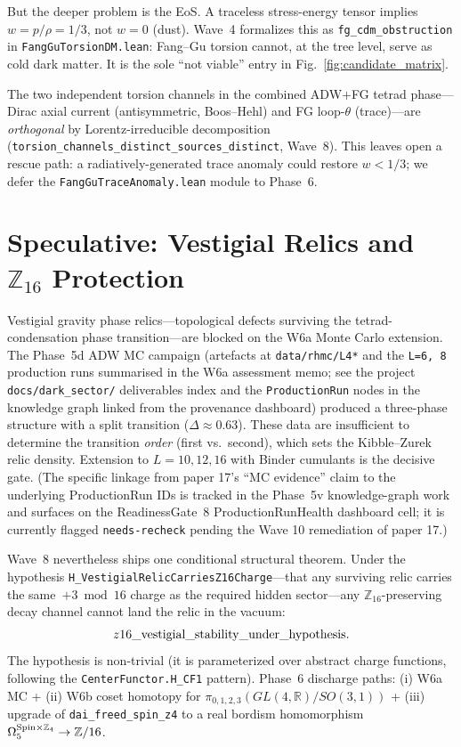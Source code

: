 \documentclass[aps,prd,twocolumn,showpacs,superscriptaddress,nofootinbib]{revtex4-2}
\begin{document}
But the deeper problem is the EoS. A traceless stress-energy tensor
implies $w = p/\rho = 1/3$, not $w = 0$ (dust). Wave~4 formalizes this
as \texttt{fg\_cdm\_obstruction} in \texttt{FangGuTorsionDM.lean}:
Fang--Gu torsion cannot, at the tree level, serve as cold dark matter.
It is the sole ``not viable'' entry in Fig.~\ref{fig:candidate_matrix}.

The two independent torsion channels in the combined ADW+FG tetrad
phase---Dirac axial current (antisymmetric, Boos--Hehl) and FG
loop-$\theta$ (trace)---are \emph{orthogonal} by Lorentz-irreducible
decomposition
(\texttt{torsion\_channels\_distinct\_sources\_distinct},
Wave~8). This leaves open a rescue path: a radiatively-generated
trace anomaly could restore $w < 1/3$; we defer the
\texttt{FangGuTraceAnomaly.lean} module to Phase~6.

\section{Speculative: Vestigial Relics and $\mathbb{Z}_{16}$ Protection}
\label{sec:speculative}

Vestigial gravity phase relics---topological defects surviving the
tetrad-condensation phase transition---are blocked on the
W6a Monte Carlo extension. The Phase~5d ADW MC campaign (artefacts at
\texttt{data/rhmc/L4*} and the \texttt{L=6, 8} production runs
summarised in the W6a assessment memo; see the project
\texttt{docs/dark\_sector/} deliverables index and the
\texttt{ProductionRun} nodes in the knowledge graph linked from the
provenance dashboard) produced a three-phase structure with a split
transition ($\Delta \approx 0.63$). These data are insufficient to
determine the transition \emph{order} (first vs.\ second), which sets
the Kibble--Zurek relic density. Extension to $L = 10, 12, 16$ with
Binder cumulants is the decisive gate. (The specific linkage from
paper 17's ``MC evidence'' claim to the underlying ProductionRun IDs
is tracked in the Phase~5v knowledge-graph work and surfaces on the
ReadinessGate~8 ProductionRunHealth dashboard cell; it is currently
flagged \texttt{needs-recheck} pending the Wave 10 remediation of
paper 17.)

Wave~8 nevertheless ships one conditional structural theorem. Under the
hypothesis \texttt{H\_VestigialRelicCarriesZ16Charge}---that any
surviving relic carries the same~$+3 \bmod 16$ charge as the required
hidden sector---any $\mathbb{Z}_{16}$-preserving decay channel cannot
land the relic in the vacuum:
\begin{equation}
z16\_{\rm vestigial\_{\rm stability\_under\_hypothesis}}.
\end{equation}
The hypothesis is non-trivial (it is parameterized over abstract charge
functions, following the \texttt{CenterFunctor.H\_CF1} pattern). Phase~6
discharge paths: (i) W6a MC + (ii) W6b coset homotopy for
$\pi_{0,1,2,3}(GL(4,\mathbb{R})/SO(3,1))$ + (iii) upgrade of
\texttt{dai\_freed\_spin\_z4} to a real bordism homomorphism
$\Omega^{{\rm Spin}\times\mathbb{Z}_4}_5 \to \mathbb{Z}/16$.
\end{document}
